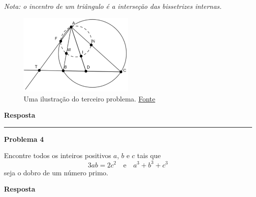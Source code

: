 \documentclass{article}
\begin{document}
  \textit{Nota: o incentro de um triângulo é a interseção das bissetrizes internas.}

  \begin{figure}[h]
    \centering
    \includegraphics[width=0.5\textwidth]{third.png}
    \caption{Uma ilustração do terceiro problema. \href{https://noic.com.br/wp-content/uploads/2025/03/Solucoes_do_TM2_2024_Nivel_A.pdf}{Fonte}}
  \end{figure}

  \medskip

  {\centering \textbf{Resposta} \par}

  \noindent\rule{\linewidth}{0.4pt}

  {\centering \textbf{Problema 4} \par}
  Encontre todos os inteiros positivos $a$, $b$ e $c$ tais que 
  \[
    3ab = 2c^2 \quad \text{e} \quad a^3 + b^3 + c^3
  \]
  seja o dobro de um número primo.

  \medskip

  {\centering \textbf{Resposta} \par}
\end{document}
